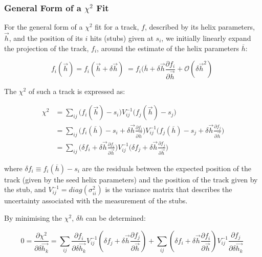 \subsubsection{General Form of a $\chi^{2}$ Fit}\label{subsubsec:chi2maths}
For the general form of a $\chi^{2}$ fit for a track, $f$, described by its helix parameters, $\overrightarrow{h}$, and 
the position of its $i$ hits (\ie stubs) given at $s_{i}$, we initially linearly expand the projection of the track, $f_{i}$, around the estimate of the helix parameters $\overline{h}$:

\begin{equation}
f_{i}(\overrightarrow{h} ) = f_{i}(\overrightarrow{h} + \delta \overrightarrow{h}) \;
                           = f_{i}(\overline{h} + \delta \overrightarrow{h} \frac{\partial f_{i}}{\partial \overrightarrow{h}} + \mathcal{O}(\delta \overrightarrow{h}^{2}) \;
\label{eq:chi1}
\end{equation}

The $\chi^{2}$ of such a track is expressed as:

\begin{equation}
\begin{split}
\chi^{2} &= \sum_{ij} \big(f_{i}(\overrightarrow{h}) - s_{i} \big) V^{-1}_{ij}  \big(f_{j}(\overrightarrow{h}) - s_{j} \big)  \\
         &= \sum_{ij} \big( f_{i}(\overline{h})  - s_{i} + \delta \overrightarrow{h} \frac{\partial f_{i}}{\partial \overrightarrow{h}} \big) V^{-1}_{ij}  \big( f_{j}(\overline{h})  - s_{j} + \delta \overrightarrow{h} \frac{\partial f_{j}}{\partial \overrightarrow{h}} \big)  \\
         &= \sum_{ij} \big( \delta f_{i} + \delta \overrightarrow{h} \frac{\partial f_{i}}{\partial \overrightarrow{h}} \big) V^{-1}_{ij}  \big( \delta f_{j} + \delta \overrightarrow{h} \frac{\partial f_{j}}{\partial \overrightarrow{h}} \big)
\end{split}
\label{eq:chi2}
\end{equation}

where $\delta f_{i} \equiv f_{i}(\overline{h}) - s_{i}$ are the residuals between the expected position of the track (given by the seed helix parameters) and the position of the track given by the stub, and $V^{-1}_{ij} = diag(\sigma^{2}_{ii})$ is the variance matrix that describes the uncertainty associated with the measurement of the stubs.

By minimising the $\chi^{2}$, $\delta h$ can be determined:

\begin{equation}
0 = \frac{\partial \chi^{2}}{\partial \delta \overrightarrow{h_{k}}} = \sum_{ij} \frac{\partial f_{i}}{\partial \delta \overrightarrow{h_{k}}} V^{-1}_{ij} ( \delta f_{j} + \delta \overrightarrow{h} \frac{\partial f_{j}}{\partial \overrightarrow{h}} ) + \sum_{ij}	( \delta f_{i} + \delta \overrightarrow{h} \frac{\partial f_{i}}{\partial \overrightarrow{h}} ) V^{-1}_{ij} \frac{\partial f_{j}}{\partial \delta \overrightarrow{h_{k}}}  \;
\label{eq:chi3}
\end{equation}

